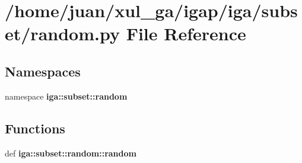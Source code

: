 \section{/home/juan/xul\_\-ga/igap/iga/subset/random.py File Reference}
\label{subset_2random_8py}
\subsection*{Namespaces}
\begin{CompactItemize}
\item 
namespace {\bf iga::subset::random}
\end{CompactItemize}
\subsection*{Functions}
\begin{CompactItemize}
\item 
def {\bf iga::subset::random::random}
\end{CompactItemize}
